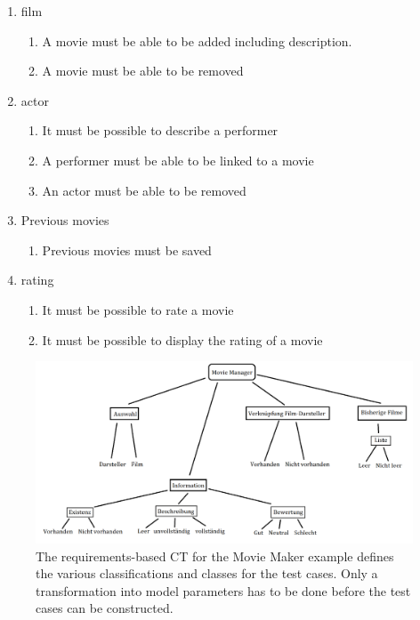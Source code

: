 \begin{enumerate}
\item film	
	\begin{enumerate}
		\item A movie must be able to be added including description.
		\item A movie must be able to be removed
	\end{enumerate}
\item actor
	\begin{enumerate}
		\item It must be possible to describe a performer
		\item A performer must be able to be linked to a movie
		\item An actor must be able to be removed
	\end{enumerate}
\item Previous movies
	\begin{enumerate}
		\item Previous movies must be saved
	\end{enumerate}
\item rating
	\begin{enumerate}
		\item It must be possible to rate a movie
		\item It must be possible to display the rating of a movie
	\end{enumerate}
\end{enumerate}

\begin{figure}[H]
\centering
\includegraphics[scale=0.3]{../../individual/groeger/images/Anforderunsbaum.png} 
\caption{The requirements-based CT for the Movie Maker example defines the various classifications and classes for the test cases. Only a transformation into model parameters has to be done before the test cases can be constructed.}
\label{fig:Movie_Maker_CT}
\end{figure}

